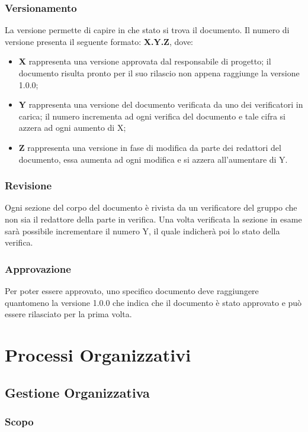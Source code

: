 \subsubsection{Versionamento}
La versione permette di capire in che stato si trova il documento. Il numero di versione presenta il seguente formato: \textbf{X.Y.Z}, dove:
\begin{itemize}
    \item \textbf{X} rappresenta una versione approvata dal 
    responsabile di 	progetto; il documento risulta pronto per il 
    suo rilascio non appena raggiunge la versione 1.0.0;
    \item \textbf{Y} rappresenta una versione del documento 
    verificata da uno dei verificatori in carica; il numero 
    incrementa ad ogni verifica del documento e tale cifra si
    azzera ad ogni aumento di X;
    \item \textbf{Z} rappresenta una versione in fase di modifica
    da parte dei redattori del documento, essa aumenta ad ogni 
    modifica e si azzera all’aumentare di Y.
\end{itemize}

\subsubsection{Revisione}
Ogni sezione del corpo del documento è rivista da un verificatore del gruppo che non sia il
redattore della parte in verifica. Una volta verificata la sezione in esame sarà possibile
incrementare il numero Y, il quale indicherà poi lo stato della verifica.

\subsubsection{Approvazione}
Per poter essere approvato, uno specifico documento deve raggiungere quantomeno la
versione 1.0.0 che indica che il documento è stato approvato e può essere rilasciato per la
prima volta.

\section{Processi Organizzativi}
\subsection{Gestione Organizzativa}

\subsubsection{Scopo}

